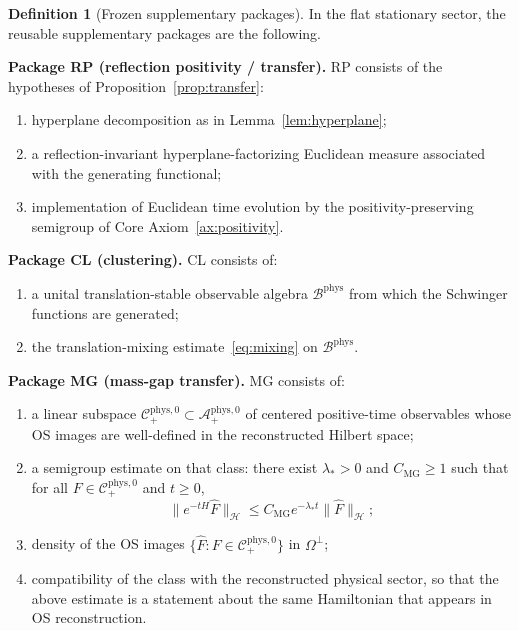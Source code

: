 \documentclass[12pt,a4paper]{article}
\theoremstyle{plain}
\theoremstyle{definition}
\newtheorem{definition}[theorem]{Definition}
\theoremstyle{remark}
\newcommand{\hilb}{\mathcal{H}}
\newcommand{\alg}{\mathcal{A}}
\begin{document}
\begin{definition}[Frozen supplementary packages]\label{def:packages}
  In the flat stationary sector, the reusable supplementary packages
  are the following.

  \medskip

  \noindent\textbf{Package RP (reflection positivity / transfer).}
  RP consists of the hypotheses of
  Proposition~\ref{prop:transfer}:
  \begin{enumerate}[nosep,label=(RP\arabic*)]
  \item hyperplane decomposition as in
    Lemma~\ref{lem:hyperplane};
  \item a reflection-invariant hyperplane-factorizing Euclidean
    measure associated with the generating functional;
  \item implementation of Euclidean time evolution by the
    positivity-preserving semigroup of Core
    Axiom~\ref{ax:positivity}.
  \end{enumerate}

  \medskip

  \noindent\textbf{Package CL (clustering).}
  CL consists of:
  \begin{enumerate}[nosep,label=(CL\arabic*)]
  \item a unital translation-stable observable algebra
    $\mathcal{B}^{\mathrm{phys}}$ from which the Schwinger functions
    are generated;
  \item the translation-mixing estimate~\eqref{eq:mixing} on
    $\mathcal{B}^{\mathrm{phys}}$.
  \end{enumerate}

  \medskip

  \noindent\textbf{Package MG (mass-gap transfer).}
  MG consists of:
  \begin{enumerate}[nosep,label=(MG\arabic*)]
  \item a linear subspace
    $\mathcal{C}^{\mathrm{phys},0}_+ \subset
    \alg^{\mathrm{phys},0}_+$ of centered positive-time observables
    whose OS images are well-defined in the reconstructed Hilbert
    space;
  \item a semigroup estimate on that class:
    there exist $\lambda_* > 0$ and $C_{\mathrm{MG}} \ge 1$ such that
    for all $F \in \mathcal{C}^{\mathrm{phys},0}_+$ and $t \ge 0$,
    \[
      \|e^{-tH}\widehat{F}\|_\hilb
      \le C_{\mathrm{MG}} e^{-\lambda_* t}\|\widehat{F}\|_\hilb;
    \]
  \item density of the OS images
    $\{\widehat{F}: F \in \mathcal{C}^{\mathrm{phys},0}_+\}$ in
    $\Omega^\perp$;
  \item compatibility of the class with the reconstructed physical
    sector, so that the above estimate is a statement about the same
    Hamiltonian that appears in OS reconstruction.
  \end{enumerate}


\end{definition}
\end{document}
